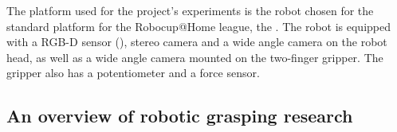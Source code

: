 The platform used for the project's experiments is the robot chosen for the standard platform for the Robocup@Home
league, the
\cite{robocupRulebook2018}. The robot is equipped with a RGB-D sensor
(), stereo camera and a wide angle camera
on the robot head, as well as a wide angle camera mounted on the two-finger gripper. The gripper also has a potentiometer
and a force sensor.

\subsection{An overview of robotic grasping research}

